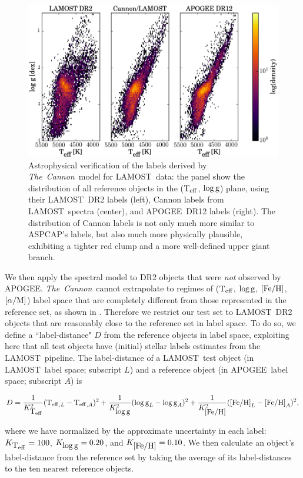 \documentclass[12pt, letterpaper, preprint]{aastex}
\newcommand{\tc}{\textsl{The~Cannon}}
\newcommand{\apogee}{APOGEE}
\newcommand{\aspcap}{ASPCAP}
\newcommand{\lamost}{LAMOST}
\newcommand{\teff}{\mbox{$\rm T_{eff}$}}
\newcommand{\feh}{\mbox{$\rm [Fe/H]$}}
\newcommand{\alpham}{\mbox{$\rm [\alpha/M]$}}
\newcommand{\logg}{\mbox{$\rm \log g$}}
\begin{document}
\begin{figure}[H]
\centering
\includegraphics[scale=0.75]{f8.eps}
\caption{Astrophysical verification of the labels derived by \tc\ model for \lamost\ data: the panel show the distribution of all reference objects in the (\teff, \logg) plane, using their \lamost\ DR2 labels (left), Cannon labels from \lamost\ spectra (center), and \apogee~DR12 labels (right). The distribution of Cannon labels is not only much more similar to \aspcap 's labels, but also much more physically plausible, exhibiting a tighter red clump and a more well-defined upper giant branch. }
\label{fig:red-clump}
\end{figure}

We then apply the spectral model to DR2 objects that were \emph{not}
observed by \apogee. \tc\ cannot extrapolate to 
regimes of (\teff, \logg, \feh, \alpham) label space that are completely different
from those represented in the reference set, as shown
in \citet{Ness2015}. Therefore we restrict our test set to \lamost\ 
DR2 objects that are reasonably close to the reference set in label space. 
To do so, we define a ``label-distance" $D$ from the reference objects in label space,
exploiting here that all test objects have (initial) stellar labels estimates from the \lamost\ pipeline. The label-distance of a \lamost\ test object
(in \lamost\ label space; subscript $L$) and a reference object
(in \apogee\ label space; subscript $A$) is

\begin{equation}
D = \frac{1}{K_{\teff}^2} (\teff_{,L}-\teff_{,A})^2 + 
\frac{1}{K_{\logg}^2} (\logg_{L}-\logg_{A})^2 + 
\frac{1}{K_{\feh}^2} (\feh_{L}-\feh_{A})^2 ,
\end{equation}

\noindent where we have normalized by the approximate uncertainty
in each label: $K_{\teff}=100$, $K_{\logg}=0.20$, and $K_{\feh}=0.10$.
We then calculate an object's label-distance from the 
reference set by taking the average of its label-distances to the ten nearest reference objects. 
\end{document}
